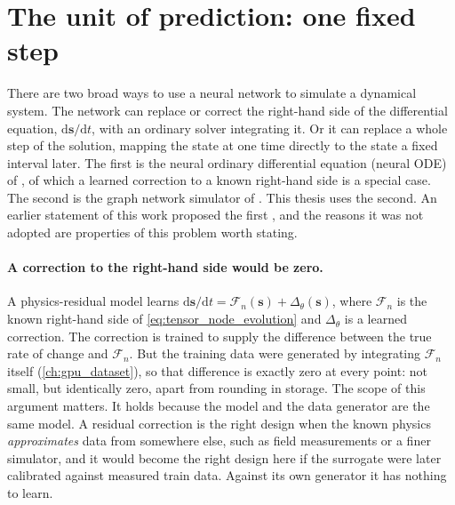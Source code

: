 \section{The unit of prediction: one fixed step}
\label{sec:arch_step}

There are two broad ways to use a neural network to simulate a dynamical system. The network can replace or correct the right-hand side of the differential equation, $\mathrm{d}\mathbf{s}/\mathrm{d}t$, with an ordinary solver integrating it. Or it can replace a whole step of the solution, mapping the state at one time directly to the state a fixed interval later. The first is the neural ordinary differential equation (neural ODE) of \cite{chen2018neuralode}, of which a learned correction to a known right-hand side is a special case. The second is the graph network simulator of \cite{sanchez2020gns}. This thesis uses the second. An earlier statement of this work proposed the first \cite{james2027trb}, and the reasons it was not adopted are properties of this problem worth stating.

\paragraph{A correction to the right-hand side would be zero.} A physics-residual model learns $\mathrm{d}\mathbf{s}/\mathrm{d}t = \mathcal{F}_n(\mathbf{s}) + \Delta_\theta(\mathbf{s})$, where $\mathcal{F}_n$ is the known right-hand side of \cref{eq:tensor_node_evolution} and $\Delta_\theta$ is a learned correction. The correction is trained to supply the difference between the true rate of change and $\mathcal{F}_n$. But the training data were generated by integrating $\mathcal{F}_n$ itself (\cref{ch:gpu_dataset}), so that difference is exactly zero at every point: not small, but identically zero, apart from rounding in storage. The scope of this argument matters. It holds because the model and the data generator are the same model. A residual correction is the right design when the known physics \emph{approximates} data from somewhere else, such as field measurements or a finer simulator, and it would become the right design here if the surrogate were later calibrated against measured train data. Against its own generator it has nothing to learn.

